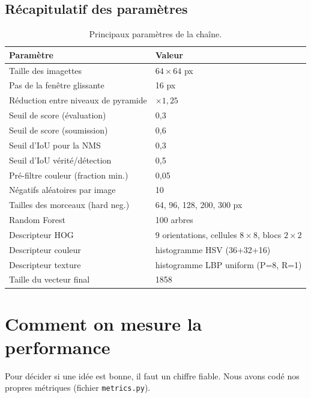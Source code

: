 \documentclass[a4paper,10pt]{article}
\begin{document}
\subsection{Récapitulatif des paramètres}
\begin{table}[h]
\centering
\caption{Principaux paramètres de la chaîne.}
\begin{tabular}{ll}
\toprule
Paramètre & Valeur \\
\midrule
Taille des imagettes                & $64\times64$ px \\
Pas de la fenêtre glissante         & 16 px \\
Réduction entre niveaux de pyramide & $\times 1{,}25$ \\
Seuil de score (évaluation)         & 0{,}3 \\
Seuil de score (soumission)         & 0{,}6 \\
Seuil d'IoU pour la NMS             & 0{,}3 \\
Seuil d'IoU vérité/détection        & 0{,}5 \\
Pré-filtre couleur (fraction min.)  & 0{,}05 \\
Négatifs aléatoires par image       & 10 \\
Tailles des morceaux (hard neg.)    & 64, 96, 128, 200, 300 px \\
Random Forest                       & 100 arbres \\
Descripteur HOG                     & 9 orientations, cellules $8\times8$, blocs $2\times2$ \\
Descripteur couleur                 & histogramme HSV (36+32+16) \\
Descripteur texture                 & histogramme LBP uniform (P=8, R=1) \\
Taille du vecteur final             & 1858 \\
\bottomrule
\end{tabular}
\label{tab:params}
\end{table}

\section{Comment on mesure la performance}
\label{sec:metriques}
Pour décider si une idée est bonne, il faut un chiffre fiable. Nous avons codé nos
propres métriques (fichier \texttt{metrics.py}).
\end{document}
